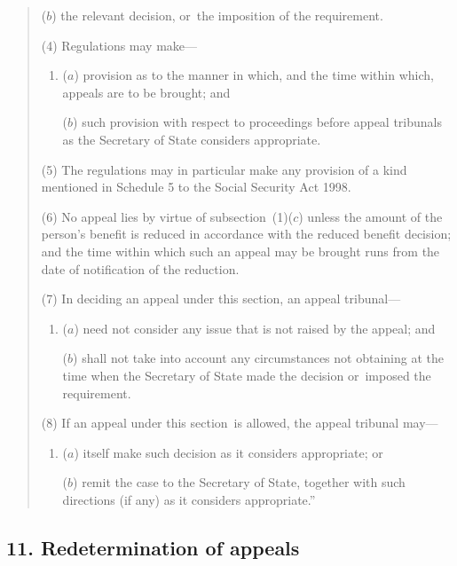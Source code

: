 \documentclass[12pt,a4paper]{article}
\begin{document}
\begin{quotation}
\begin{enumerate}
($b$) the relevant decision, or~the imposition of the requirement.
\end{enumerate}

(4) Regulations may make—
\begin{enumerate}\item[]
($a$) provision as to the manner in which, and the time within which, appeals are to be brought; and

($b$) such provision with respect to proceedings before appeal tribunals as the Secretary of State considers appropriate.
\end{enumerate}

(5) The regulations may in particular make any provision of a kind mentioned in Schedule 5 to the Social Security Act 1998. 

(6) No appeal lies by virtue of subsection~(1)($c$)  unless the amount of the person’s benefit is reduced in accordance with the reduced benefit decision; and the time within which such an appeal may be brought runs from the date of notification of the reduction.

(7) In deciding an appeal under this section, an appeal tribunal—
\begin{enumerate}\item[]
($a$) need not consider any issue that is not raised by the appeal; and

($b$) shall not take into account any circumstances not obtaining at the time when the Secretary of State made the decision or~imposed the requirement.
\end{enumerate}

(8) If an appeal under this section~is allowed, the appeal tribunal may—
\begin{enumerate}\item[]
($a$) itself make such decision as it considers appropriate; or

($b$) remit the case to the Secretary of State, together with such directions (if any) as it considers appropriate.”
\end{enumerate}
\end{quotation}


\subsection{11. Redetermination of appeals}
\end{document}
